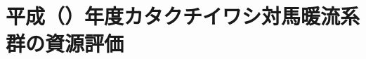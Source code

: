 %
%
%
\chapter{平成\ThisYrJp（\ThisYr）年度カタクチイワシ対馬暖流系群の資源評価}
%











\clearpage

%
\setcounter{chapter}{0}

